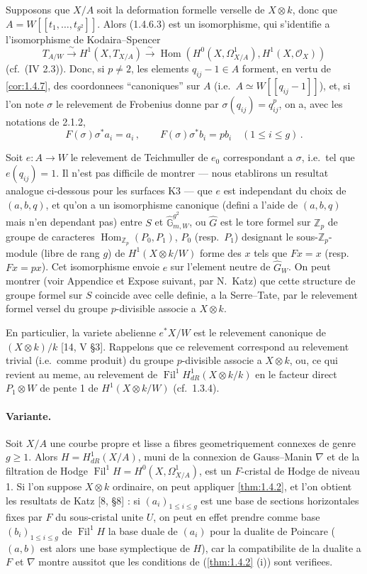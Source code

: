 \documentclass[12pt,a4paper]{article}
\theoremstyle{plain}
\theoremstyle{definition}
\theoremstyle{remark}
\DeclareMathOperator{\Hom}{Hom}
\DeclareMathOperator{\Fil}{Fil}
\begin{document}
Supposons que $X/A$ soit la deformation formelle verselle de $X \otimes k$, donc que $A = W[[t_1, \ldots, t_{g^2}]]$. Alors (1.4.6.3) est un isomorphisme, qui s'identifie a l'isomorphisme de Kodaira--Spencer
\[
T_{A/W} \xrightarrow{\;\sim\;} H^1(X, T_{X/A}) \xrightarrow{\;\sim\;} \Hom(H^0(X, \Omega_{X/A}^1), H^1(X, \mathcal{O}_X))
\]
(cf.\ (IV 2.3)). Donc, si $p \neq 2$, les elements $q_{ij} - 1 \in A$ forment, en vertu de \ref{cor:1.4.7}, des coordonnees ``canoniques'' sur $A$ (i.e.\ $A \simeq W[[q_{ij} - 1]]$), et, si l'on note $\sigma$ le relevement de Frobenius donne par $\sigma(q_{ij}) = q_{ij}^p$, on a, avec les notations de 2.1.2,
\[
F(\sigma)\sigma^*a_i = a_i\,, \qquad F(\sigma)\sigma^*b_i = pb_i \quad (1 \leq i \leq g)\,.\]

Soit $e : A \to W$ le relevement de Teichmuller de $e_0$ correspondant a $\sigma$, i.e.\ tel que $e(q_{ij}) = 1$. Il n'est pas difficile de montrer --- nous etablirons un resultat analogue ci-dessous pour les surfaces K3 --- que $e$ est independant du choix de $(a, b, q)$, et qu'on a un isomorphisme canonique (defini a l'aide de $(a, b, q)$ mais n'en dependant pas) entre $S$ et $\widehat{\mathbb{G}}_{m,W}^{g^2}$, ou $\widehat{G}$ est le tore formel sur $\mathbb{Z}_p$ de groupe de caracteres $\Hom_{\mathbb{Z}_p}(P_0, P_1)$, $P_0$ (resp.\ $P_1$) designant le sous-$\mathbb{Z}_p$-module (libre de rang $g$) de $H^1(X \otimes k/W)$ forme des $x$ tels que $Fx = x$ (resp.\ $Fx = px$). Cet isomorphisme envoie $e$ sur l'element neutre de $\widehat{G}_W$. On peut montrer (voir Appendice et Expose suivant, par N.\ Katz) que cette structure de groupe formel sur $S$ coincide avec celle definie, a la Serre--Tate, par le relevement formel versel du groupe $p$-divisible associe a $X \otimes k$.

En particulier, la variete abelienne $e^*X/W$ est le relevement canonique de $(X \otimes k)/k$ [14, V \S 3]. Rappelons que ce relevement correspond au relevement trivial (i.e.\ comme produit) du groupe $p$-divisible associe a $X \otimes k$, ou, ce qui revient au meme, au relevement de $\Fil^1H_{dR}^1(X \otimes k/k)$ en le facteur direct $P_1 \otimes W$ de pente 1 de $H^1(X \otimes k/W)$ (cf.\ 1.3.4).

\paragraph{Variante.}

Soit $X/A$ une courbe propre et lisse a fibres geometriquement connexes de genre $g \geq 1$. Alors $H = H_{dR}^1(X/A)$, muni de la connexion de Gauss--Manin $\nabla$ et de la filtration de Hodge $\Fil^1H = H^0(X, \Omega_{X/A}^1)$, est un $F$-cristal de Hodge de niveau 1. Si l'on suppose $X \otimes k$ ordinaire, on peut appliquer \ref{thm:1.4.2}, et l'on obtient les resultats de Katz [8, \S 8] : si $(a_i)_{1 \leq i \leq g}$ est une base de sections horizontales fixes par $F$ du sous-cristal unite $U$, on peut en effet prendre comme base $(b_i)_{1 \leq i \leq g}$ de $\Fil^1H$ la base duale de $(a_i)$ pour la dualite de Poincare ($(a,b)$ est alors une base symplectique de $H$), car la compatibilite de la dualite a $F$ et $\nabla$ montre aussitot que les conditions de (\ref{thm:1.4.2} (i)) sont verifiees.
\end{document}
